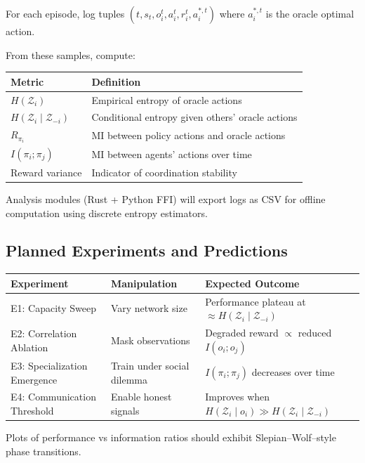 \documentclass[10pt, letterpaper]{article}
\begin{document}
For each episode, log tuples $(t, s_t, o_i^t, a_i^t, r_i^t, a_i^{*,t})$ where $a_i^{*,t}$ is the oracle optimal action.

From these samples, compute:

\begin{center}
\begin{tabular}{ll}
\toprule
\textbf{Metric} & \textbf{Definition} \\
\midrule
$H(\mathcal{Z}_i)$ & Empirical entropy of oracle actions \\
$H(\mathcal{Z}_i \mid \mathcal{Z}_{-i})$ & Conditional entropy given others' oracle actions \\
$R_{\pi_i}$ & MI between policy actions and oracle actions \\
$I(\pi_i;\pi_j)$ & MI between agents' actions over time \\
Reward variance & Indicator of coordination stability \\
\bottomrule
\end{tabular}
\end{center}

Analysis modules (Rust + Python FFI) will export logs as CSV for offline computation using discrete entropy estimators.

\subsection{Planned Experiments and Predictions}

\begin{center}
\begin{tabular}{lll}
\toprule
\textbf{Experiment} & \textbf{Manipulation} & \textbf{Expected Outcome} \\
\midrule
E1: Capacity Sweep & Vary network size & Performance plateau at $\approx H(\mathcal{Z}_i \mid \mathcal{Z}_{-i})$ \\
E2: Correlation Ablation & Mask observations & Degraded reward $\propto$ reduced $I(o_i; o_j)$ \\
E3: Specialization Emergence & Train under social dilemma & $I(\pi_i; \pi_j)$ decreases over time \\
E4: Communication Threshold & Enable honest signals & Improves when $H(\mathcal{Z}_i \mid o_i) \gg H(\mathcal{Z}_i \mid \mathcal{Z}_{-i})$ \\
\bottomrule
\end{tabular}
\end{center}

Plots of performance vs information ratios should exhibit Slepian--Wolf--style phase transitions.
\end{document}
